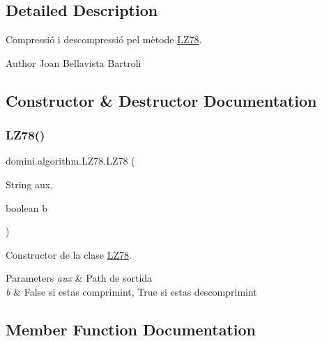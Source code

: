 \subsection{Detailed Description}
Compressió i descompressió pel mètode \hyperlink{classdomini_1_1algorithm_1_1LZ78}{L\+Z78}. 

\begin{DoxyAuthor}{Author}
Joan Bellavista Bartroli 
\end{DoxyAuthor}


\subsection{Constructor \& Destructor Documentation}
\mbox{\label{classdomini_1_1algorithm_1_1LZ78_afb5950cfc6a4887611298f6c1fd83d26}} 
\subsubsection{\texorpdfstring{L\+Z78()}{LZ78()}}
{\footnotesize\ttfamily domini.\+algorithm.\+L\+Z78.\+L\+Z78 (\begin{DoxyParamCaption}\item[{String}]{aux,  }\item[{boolean}]{b }\end{DoxyParamCaption})\hspace{0.3cm}{\ttfamily [inline]}}



Constructor de la clase \hyperlink{classdomini_1_1algorithm_1_1LZ78}{L\+Z78}. 


\begin{DoxyParams}{Parameters}
{\em aux} & Path de sortida \\
\hline
{\em b} & False si estas comprimint, True si estas descomprimint \\
\hline
\end{DoxyParams}


\subsection{Member Function Documentation}
\mbox{\label{classdomini_1_1algorithm_1_1LZ78_a545765a19a5eeababaeeee20fc480116}} 
